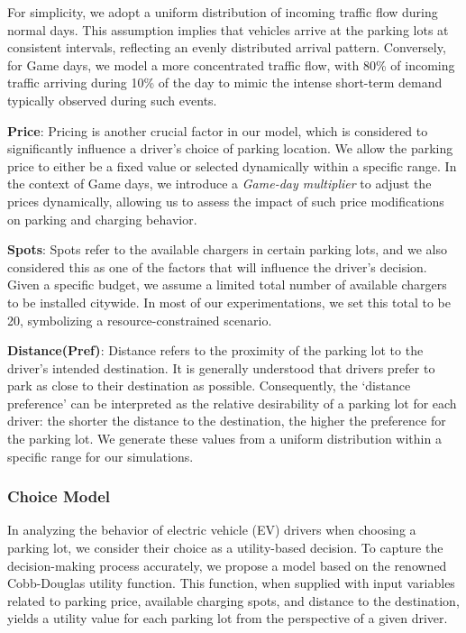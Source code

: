 For simplicity, we adopt a uniform distribution of incoming traffic flow during normal days. This assumption implies that vehicles arrive at the parking lots at consistent intervals, reflecting an evenly distributed arrival pattern. Conversely, for Game days, we model a more concentrated traffic flow, with 80\% of incoming traffic arriving during 10\% of the day to mimic the intense short-term demand typically observed during such events.


\textbf{Price}: Pricing is another crucial factor in our model, which is considered to significantly influence a driver's choice of parking location. We allow the parking price to either be a fixed value or selected dynamically within a specific range. In the context of Game days, we introduce a \textit{Game-day multiplier} to adjust the prices dynamically, allowing us to assess the impact of such price modifications on parking and charging behavior.

\textbf{Spots}: Spots refer to the available chargers in certain parking lots, and we also considered this as one of the factors that will influence the driver's decision. Given a specific budget, we assume a limited total number of available chargers to be installed citywide. In most of our experimentations, we set this total to be 20, symbolizing a resource-constrained scenario.

\textbf{Distance(Pref)}: Distance refers to the proximity of the parking lot to the driver's intended destination. It is generally understood that drivers prefer to park as close to their destination as possible. Consequently, the `distance preference' can be interpreted as the relative desirability of a parking lot for each driver: the shorter the distance to the destination, the higher the preference for the parking lot. We generate these values from a uniform distribution within a specific range for our simulations.

\subsubsection{Choice Model}

In analyzing the behavior of electric vehicle (EV) drivers when choosing a parking lot, we consider their choice as a utility-based decision. To capture the decision-making process accurately, we propose a model based on the renowned Cobb-Douglas utility function. This function, when supplied with input variables related to parking price, available charging spots, and distance to the destination, yields a utility value for each parking lot from the perspective of a given driver. 

